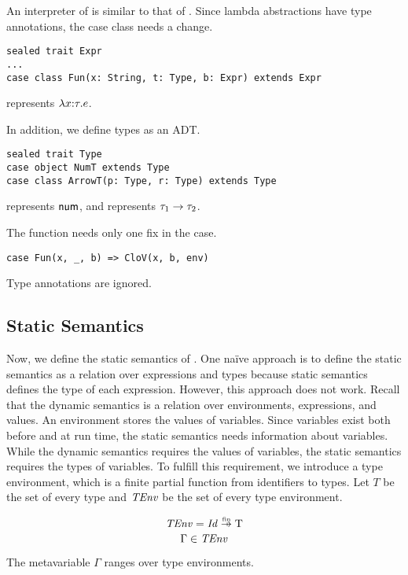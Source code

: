 An interpreter of \Lang is similar to that of \plang. Since lambda abstractions
have type annotations, the  case class needs a change.

\begin{verbatim}
sealed trait Expr
...
case class Fun(x: String, t: Type, b: Expr) extends Expr
\end{verbatim}

 represents $\lambda x{:}\tau.e$.

In addition, we define types as an ADT.

\begin{verbatim}
sealed trait Type
case object NumT extends Type
case class ArrowT(p: Type, r: Type) extends Type
\end{verbatim}

 represents $\textsf{num}$, and  represents
$\tau_1\rightarrow\tau_2$.

The  function needs only one fix in the  case.

\begin{verbatim}
case Fun(x, _, b) => CloV(x, b, env)
\end{verbatim}

Type annotations are ignored.

\subsection{Static Semantics}

Now, we define the static semantics of \Lang. One naïve approach is to define
the static semantics as a relation over expressions and types because static
semantics defines the type of each expression. However, this approach does not
work. Recall that the dynamic semantics is a
relation over environments, expressions, and values. An environment stores the
values of variables. Since variables exist both before and at run time, the static
semantics needs information about variables. While the dynamic semantics requires the
values of variables, the static semantics requires the types of variables.
To fulfill this requirement,
we introduce a type environment, which is a finite partial function from identifiers to types.
Let $T$ be the set of every type and $\mbox{\emph{TEnv}}$ be the set of every type
environment.

\[ \embox{TEnv} = \embox{Id}\finto\text{T} \]
\[ \Gamma \in \mbox{\emph{TEnv}} \]

The metavariable $\Gamma$ ranges over type environments.

